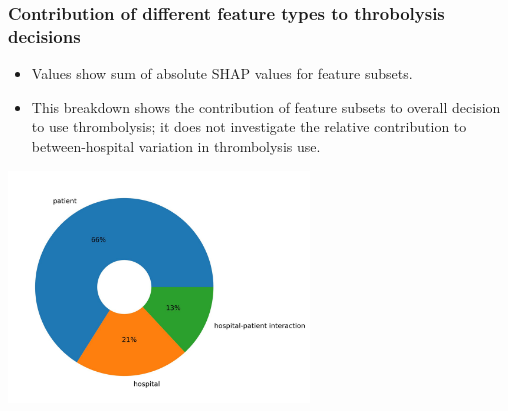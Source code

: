\begin{frame}
\frametitle{Contribution of different feature types to throbolysis decisions}

\small
\begin{itemize}
    \item Values show sum of absolute SHAP values for feature subsets.
    \item This breakdown shows the contribution of feature subsets to overall decision to use thrombolysis; it does not investigate the relative contribution to between-hospital variation in thrombolysis use.
\end{itemize}

\begin{center}
    \includegraphics[width=0.60\textwidth]{./images/03f_shap_contributions}
\end{center}

\end{frame}